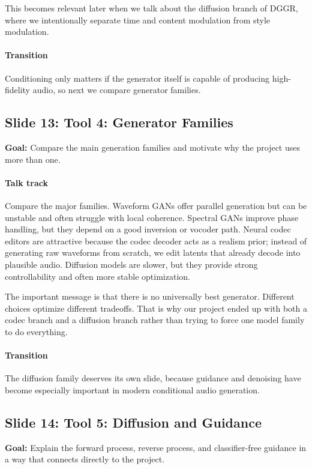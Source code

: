 \documentclass[11pt]{article}
\begin{document}
This becomes relevant later when we talk about the diffusion branch of DGGR, where we intentionally separate time and content modulation from style modulation.

\paragraph{Transition}
Conditioning only matters if the generator itself is capable of producing high-fidelity audio, so next we compare generator families.

\subsection*{Slide 13: Tool 4: Generator Families}
\textbf{Goal:} Compare the main generation families and motivate why the project uses more than one.
\paragraph{Talk track}
Compare the major families. Waveform GANs offer parallel generation but can be unstable and often struggle with local coherence. Spectral GANs improve phase handling, but they depend on a good inversion or vocoder path. Neural codec editors are attractive because the codec decoder acts as a realism prior; instead of generating raw waveforms from scratch, we edit latents that already decode into plausible audio. Diffusion models are slower, but they provide strong controllability and often more stable optimization.

The important message is that there is no universally best generator. Different choices optimize different tradeoffs. That is why our project ended up with both a codec branch and a diffusion branch rather than trying to force one model family to do everything.

\paragraph{Transition}
The diffusion family deserves its own slide, because guidance and denoising have become especially important in modern conditional audio generation.

\subsection*{Slide 14: Tool 5: Diffusion and Guidance}
\textbf{Goal:} Explain the forward process, reverse process, and classifier-free guidance in a way that connects directly to the project.
\end{document}

